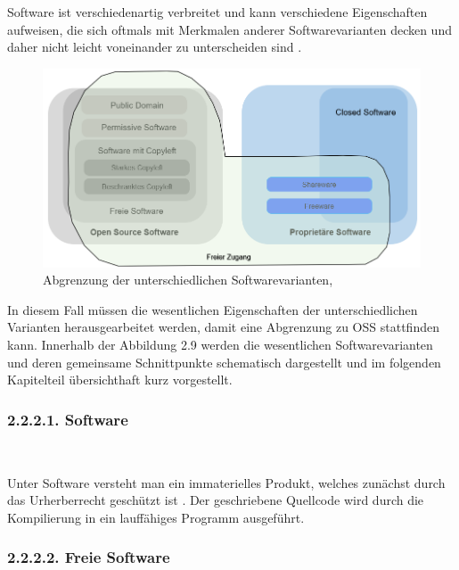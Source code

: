 Software ist verschiedenartig verbreitet und kann verschiedene Eigenschaften aufweisen, die sich oftmals mit Merkmalen anderer Softwarevarianten decken und daher nicht leicht voneinander zu unterscheiden sind \cite[S. 3]{wichmann_linux-_2005}.

\begin{figure}[h]
    \centering
    \includegraphics[scale=0.6]{Bilder/AbgrenzungSWvarianten.png}
    \caption{Abgrenzung der unterschiedlichen Softwarevarianten, \cite[S. 7]{wichmann_linux-_2005}}
\end{figure}

In diesem Fall müssen die wesentlichen Eigenschaften der unterschiedlichen Varianten herausgearbeitet werden, damit eine Abgrenzung zu OSS stattfinden kann. Innerhalb der Abbildung 2.9 werden die wesentlichen Softwarevarianten und deren gemeinsame Schnittpunkte schematisch dargestellt und im folgenden Kapitelteil übersichthaft kurz vorgestellt. 

\subsubsection{2.2.2.1. Software} $~$

Unter Software versteht man ein immaterielles Produkt, welches zunächst durch das Urherberrecht geschützt ist \cite[S. 24]{groll_1x1_2021}. Der geschriebene Quellcode wird durch die Kompilierung in ein lauffähiges Programm ausgeführt.

\subsubsection{2.2.2.2. Freie Software}$~$

